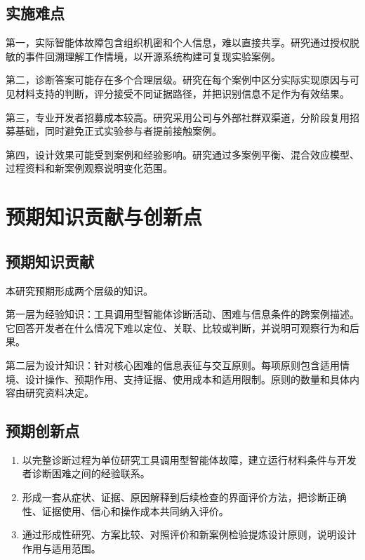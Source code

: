 \subsection{实施难点}

第一，实际智能体故障包含组织机密和个人信息，难以直接共享。研究通过授权脱敏的事件回溯理解工作情境，以开源系统构建可复现实验案例。

第二，诊断答案可能存在多个合理层级。研究在每个案例中区分实际实现原因与可见材料支持的判断，评分接受不同证据路径，并把识别信息不足作为有效结果。

第三，专业开发者招募成本较高。研究采用公司与外部社群双渠道，分阶段复用招募基础，同时避免正式实验参与者提前接触案例。

第四，设计效果可能受到案例和经验影响。研究通过多案例平衡、混合效应模型、过程资料和新案例观察说明变化范围。

\section{预期知识贡献与创新点}

\subsection{预期知识贡献}

本研究预期形成两个层级的知识。

第一层为经验知识：工具调用型智能体诊断活动、困难与信息条件的跨案例描述。它回答开发者在什么情况下难以定位、关联、比较或判断，并说明可观察行为和后果。

第二层为设计知识：针对核心困难的信息表征与交互原则。每项原则包含适用情境、设计操作、预期作用、支持证据、使用成本和适用限制。原则的数量和具体内容由研究资料决定。

\subsection{预期创新点}

\begin{enumerate}
  \item 以完整诊断过程为单位研究工具调用型智能体故障，建立运行材料条件与开发者诊断困难之间的经验联系。
  \item 形成一套从症状、证据、原因解释到后续检查的界面评价方法，把诊断正确性、证据使用、信心和操作成本共同纳入评价。
  \item 通过形成性研究、方案比较、对照评价和新案例检验提炼设计原则，说明设计作用与适用范围。
\end{enumerate}

